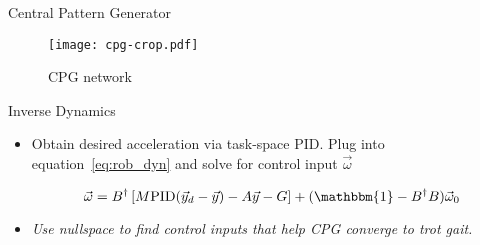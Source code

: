 \textcolor{prime}{\textsf{Central Pattern Generator}} \\
\begin{figure}[h]
	\centering
    \texttt{[image: cpg-crop.pdf]}
    \caption{CPG network}
    \label{fig:CPG_Network}
\end{figure}

\textcolor{prime}{\textsf{Inverse Dynamics}} \\
\begin{itemize}
\item
    Obtain desired acceleration via task-space PID. Plug into equation~\ref{eq:rob_dyn} and solve for control input $\vec{\omega}$

    \begin{equation*}
        \vec{\omega} = B^{\dagger} \left[M \mathrm{PID}(\vec{y}_d - \vec{y})- A \vec{y} - G \right] + (\mathbbm{1} - B^{\dagger} B) \vec{\omega}_0 \label{eq:control}
    \end{equation*}

\item
    \textit{Use nullspace to find control inputs that help CPG converge to trot gait.}
\end{itemize}
